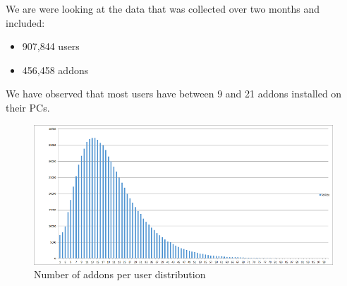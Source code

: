 \documentclass[11pt,oneside]{book}
\begin{document}
We are were looking at the data that was collected over two months and included:
\begin{itemize}
\renewcommand{\labelitemi}{$\bullet$} 
\item 907,844 users
\item 456,458 addons
\end{itemize}
We have observed that most users have between 9 and 21 addons installed on their PCs.

\begin{figure}[t]
\centering
\begin{small}
\includegraphics[scale=.9,angle=0]{figures/user_addons_histogram.png}
\end{small}
\caption{Number of addons per user distribution}
\label{fig:user_addons_histogram}
\end{figure}

\
\end{document}
